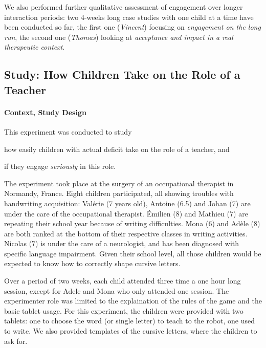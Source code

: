 \documentclass{article}
\begin{document}
We also performed further qualitative assessment of engagement over longer
interaction periods: two 4-weeks long case studies with one child at a time have
been conducted so far, the first one (\emph{Vincent}) focusing on
\emph{engagement on the long run}, the second one (\emph{Thomas}) looking at
\emph{acceptance and impact in a real therapeutic context}.

\subsection{Study: How Children Take on the Role of a Teacher}\label{normandie}

\paragraph{Context, Study Design}

\begin{inparaenum}
This experiment was conducted to study \item how easily children with actual
deficit take on the role of a teacher, and \item if they engage \emph{seriously}
in this role.
\end{inparaenum}

The experiment took place at the surgery of an occupational therapist in
Normandy, France. Eight children participated, all showing troubles with
handwriting acquisition: Valérie (7 years old), Antoine (6.5) and Johan
(7) are under the care of the occupational therapist. Émilien (8) and Mathieu (7)
are repeating their school year because of writing difficulties. Mona (6) and
Adèle (8) are both ranked at the bottom of their respective classes in writing
activities. Nicolas (7) is under the care of a neurologist, and has been
diagnosed with specific language impairment. Given their school level, all those
children would be expected to know how to correctly shape cursive letters. 

Over a period of two weeks, each child attended three time a one hour long
session, except for Adele and Mona who only attended one session. The
experimenter role was limited to the explaination of the rules of the game and
the basic tablet usage. For this experiment, the children were provided with two
tablets: one to choose the word (or single letter) to teach to the robot, one
used to write. We also provided templates of the cursive letters, where the
children to ask for.
\end{document}
